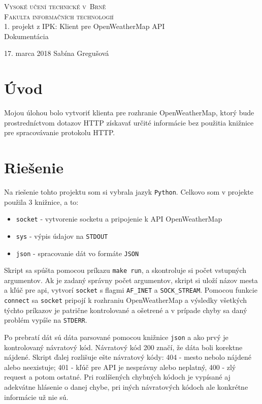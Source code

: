 \documentclass[11pt, a4paper]{article}
\begin{document}
\begin{titlepage}
\begin{center}
\Huge
\textsc{Vysoké učení technické v~Brně}\\
\huge
\textsc{Fakulta informačních technologií}\\
\LARGE 1. projekt z IPK: Klient pre OpenWeatherMap API\\
\Huge Dokumentácia
\end{center}
{\Large 17. marca 2018 \hfill
Sabína Gregušová}
\end{titlepage}

\section{Úvod}

Mojou úlohou bolo vytvoriť klienta pre rozhranie OpenWeatherMap, ktorý bude prostredníctvom dotazov HTTP získavať určité informácie bez použitia knižnice pre spracovávanie protokolu HTTP.
 \section{Riešenie}
Na riešenie tohto projektu som si vybrala jazyk \texttt{Python}. Celkovo som v projekte použila 3 knižnice, a to:
\begin{itemize}
\item \texttt{socket} - vytvorenie socketu a pripojenie k API OpenWeatherMap
\item \texttt{sys} - výpis údajov na \texttt{STDOUT}
\item \texttt{json} - spracovanie dát vo formáte \texttt{JSON}
\end{itemize}

Skript sa spúšta pomocou príkazu \texttt{make run}, a skontroluje si počet vstupných argumentov. Ak je zadaný správny počet argumentov, skript si uloží názov mesta a kľúč pre api, vytvorí \texttt{socket} s flagmi \texttt{AF\_INET} a \texttt{SOCK\_STREAM}. Pomocou funkcie \texttt{connect} sa \texttt{socket} pripojí k rozhraniu OpenWeatherMap a výsledky všetkých týchto príkazov je patrične kontrolované a ošetrené a v prípade chyby sa daný problém vypíše na \texttt{STDERR}.

Po prebratí dát sú dáta parsované pomocou knižnice \texttt{json} a ako prvý je kontrolovaný návratový kód. Návratový kód 200 značí, že dáta boli korektne nájdené. Skript ďalej rozlišuje ešte návratový kódy: 404 - mesto nebolo nájdené alebo neexistuje; 401 - kľúč pre API je nesprávny alebo neplatný, 400 - zlý request a potom ostatné. Pri rozlíšených chybných kódoch je vypísané aj adekvátne hlásenie o danej chybe, pri iných návratových kódoch ale konkrétne informácie už nie sú.
\end{document}
